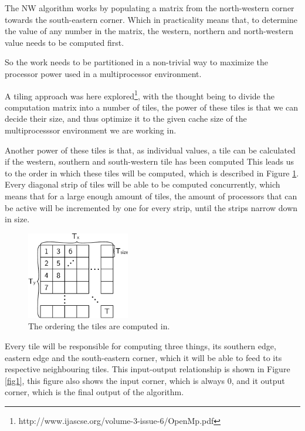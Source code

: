The NW algorithm works by populating a matrix from the north-western corner towards the south-eastern corner. Which in practicality means that, to determine the value of any number in the matrix, the western, northern and north-western value needs to be computed first.

So the work needs to be partitioned in a non-trivial way to maximize the processor power used in a multiprocessor environment.

A tiling approach was here explored\footnote{http://www.ijascse.org/volume-3-issue-6/OpenMp.pdf}, with the thought being to divide the computation matrix into a number of tiles, the power of these tiles is that we can decide their size, and thus optimize it to the given cache size of the multiprocesssor environment we are working in.

Another power of these tiles is that, as individual values, a tile can be calculated if the western, southern and south-western tile has been computed This leads us to the order in which these tiles will be computed, which is described in Figure \ref{fig2}. Every diagonal strip of tiles will be able to be computed concurrently, which means that for a large enough amount of tiles, the amount of processors that can be active will be incremented by one for every strip, until the strips narrow down in size.
\begin{figure}[H]
  \center
  \includegraphics[width=0.4\textwidth]{fig/fig2.pdf}
  \caption{The ordering the tiles are computed in.}
  \label{fig2}
\end{figure}
Every tile will be responsible for computing three things, its southern edge, eastern edge and the south-eastern corner, which it will be able to feed to its respective neighbouring tiles. This input-output relationship is shown in Figure \ref{fig1}, this figure also shows the input corner, which is always 0, and it output corner, which is the final output of the algorithm.
